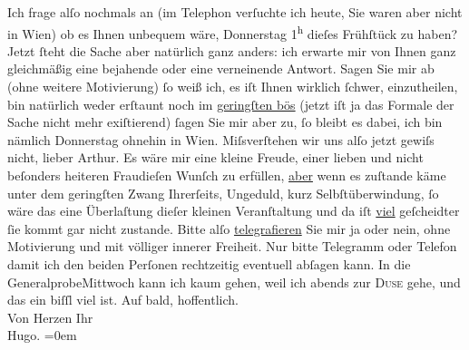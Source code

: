 \begin{ledgroupsized}[t]{13cm}
           \pstart
           Ich frage alſo nochmals an (im Telephon verſuchte ich heute, Sie waren aber nicht in
                  Wien) ob es Ihnen unbequem wäre,
                  Donnerstag{ }1\textsuperscript{h} dieſes Frühſtück zu haben? Jetzt ſteht die Sache aber
                  {\pb}natürlich ganz anders: ich
               erwarte mir von Ihnen ganz gleichmäßig eine bejahende oder eine verneinende Antwort.
               Sagen Sie mir ab (ohne weitere Motivierung) ſo weiß ich, es iſt Ihnen wirklich
               ſchwer, einzutheilen, bin natürlich weder erſtaunt noch im \uline{geringſten bös} (jetzt iſt ja das Formale der Sache nicht mehr exiſtierend)
                  {\pb}ſagen Sie mir aber zu, ſo
               bleibt es dabei, ich bin nämlich Donnerstag ohnehin in Wien.\pend
           \pstart
           Miſsverſtehen wir uns alſo jetzt gewiſs nicht, lieber Arthur.\pend
           \pstart
           Es wäre mir eine kleine Freude, einer lieben und nicht beſonders heiteren Fraudieſen Wunſch zu erfüllen, \uline{aber} wenn es zuſtande käme unter dem geringſten Zwang
               Ihrerſeits, Ungeduld, kurz Selbſtüberwindung, ſo wäre das eine Überlaſtung dieſer
               kleinen Veranſtaltung und da iſt \uline{viel} geſcheidter {\pb}ſie kommt gar nicht zustande.\pend
           \pstart
           Bitte alſo \uline{telegrafieren} Sie mir ja oder nein, ohne
               Motivierung und mit völliger innerer Freiheit.\pend
           \pstart
           Nur bitte Telegramm oder Telefon damit ich den beiden Perſonen rechtzeitig eventuell {\pb}abſagen kann.\pend
           \pstart
           In die GeneralprobeMittwoch kann ich kaum gehen, weil ich abends zur \textsc{Duse} gehe, und das ein biſſl viel ist.\pend
           \pstart
           Auf bald, hoffentlich.{\\[\baselineskip]}Von Herzen Ihr{\\[\baselineskip]}\spacefill\mbox{Hugo.}\pend
           \leftskip=0em{}          \endnumbering{}\end{ledgroupsized}  \newcommand{\dateiname}{L01213}\newcommand{\titel}{Hugo von Hofmannsthal an Arthur Schnitzler, [30. 3. 1902]}\newcommand{\editorInnen}{Martin Anton Müller und Gerd-Hermann Susen}
      